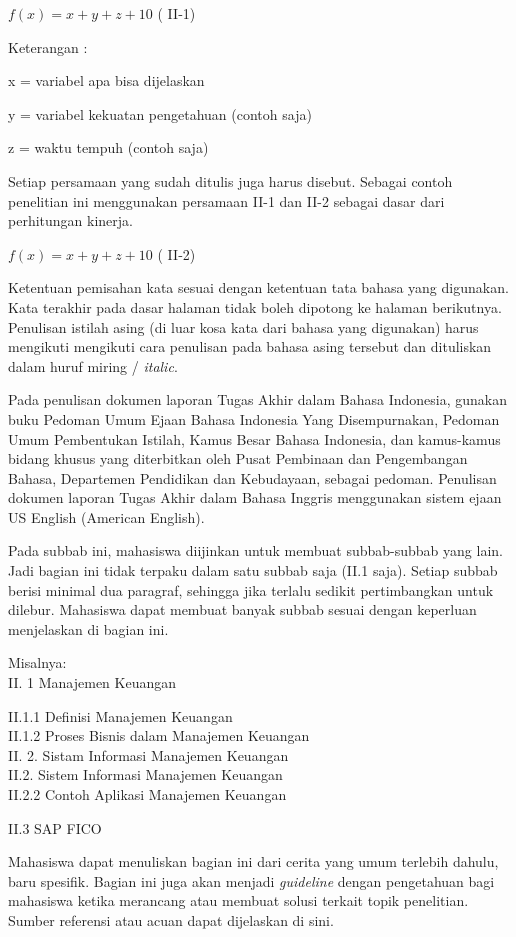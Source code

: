 \(f(x) = x + y + z + 10\) ( II‑1)

Keterangan :

x = variabel apa bisa dijelaskan

y = variabel kekuatan pengetahuan (contoh saja)

z = waktu tempuh (contoh saja)

Setiap persamaan yang sudah ditulis juga harus disebut. Sebagai contoh
penelitian ini menggunakan persamaan II-1 dan II-2 sebagai dasar dari
perhitungan kinerja.

\(f(x) = x + y + z + 10\) ( II‑2)

Ketentuan pemisahan kata sesuai dengan ketentuan tata bahasa yang
digunakan. Kata terakhir pada dasar halaman tidak boleh dipotong ke
halaman berikutnya. Penulisan istilah asing (di luar kosa kata dari
bahasa yang digunakan) harus mengikuti mengikuti cara penulisan pada
bahasa asing tersebut dan dituliskan dalam huruf miring / \emph{italic}.

Pada penulisan dokumen laporan Tugas Akhir dalam Bahasa Indonesia,
gunakan buku Pedoman Umum Ejaan Bahasa Indonesia Yang Disempurnakan,
Pedoman Umum Pembentukan Istilah, Kamus Besar Bahasa Indonesia, dan
kamus-kamus bidang khusus yang diterbitkan oleh Pusat Pembinaan dan
Pengembangan Bahasa, Departemen Pendidikan dan Kebudayaan, sebagai
pedoman. Penulisan dokumen laporan Tugas Akhir dalam Bahasa Inggris
menggunakan sistem ejaan US English (American English).

Pada subbab ini, mahasiswa diijinkan untuk membuat subbab-subbab yang
lain. Jadi bagian ini tidak terpaku dalam satu subbab saja (II.1 saja).
Setiap subbab berisi minimal dua paragraf, sehingga jika terlalu sedikit
pertimbangkan untuk dilebur. Mahasiswa dapat membuat banyak subbab
sesuai dengan keperluan menjelaskan di bagian ini.

Misalnya:\\
II. 1 Manajemen Keuangan

II.1.1 Definisi Manajemen Keuangan\\
II.1.2 Proses Bisnis dalam Manajemen Keuangan\\
II. 2. Sistam Informasi Manajemen Keuangan\\
II.2. Sistem Informasi Manajemen Keuangan\\
II.2.2 Contoh Aplikasi Manajemen Keuangan

II.3 SAP FICO

Mahasiswa dapat menuliskan bagian ini dari cerita yang umum terlebih
dahulu, baru spesifik. Bagian ini juga akan menjadi \emph{guideline}
dengan pengetahuan bagi mahasiswa ketika merancang atau membuat solusi
terkait topik penelitian. Sumber referensi atau acuan dapat dijelaskan
di sini.


